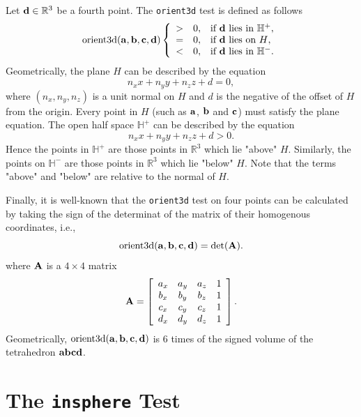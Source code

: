 Let ${\bf d} \in \mathbb{R}^3$ be a fourth point. The {\tt orient3d} test is defined as follows
\begin{equation}
  \textrm{orient3d}({\bf a}, {\bf b}, {\bf c}, {\bf d})
  \left\{
  \begin{array}{ccl}
  > & 0, & \textrm{if ${\bf d}$ lies in $\mathbb{H}^+$},\\
  = & 0, & \textrm{if ${\bf d}$ lies on $H$},\\
  < & 0, & \textrm{if ${\bf d}$ lies in $\mathbb{H}^-$}.  
  \end{array}
  \right.
\end{equation}
Geometrically, the plane $H$ can be described by the equation
\[
 n_x x + n_y y + n_z z + d = 0,
\]
where $(n_x, n_y, n_z)$ is a unit normal on $H$ and $d$ is the negative of the offset of $H$ from the origin. Every point in $H$ (such as ${\bf a}$, ${\bf b}$ and ${\bf c}$) must satisfy the plane equation. The open half space $\mathbb{H}^+$ can be described by the equation
\[
 n_x x + n_y y + n_z z + d > 0.
\]
Hence the points in $\mathbb{H}^+$ are those points in $\mathbb{R}^3$ which lie "above" $H$. Similarly, the points on $\mathbb{H}^-$ are those points  in $\mathbb{R}^3$ which lie "below" $H$. Note that the terms "above" and "below" are relative to the normal of $H$.

Finally, it is well-known that the {\tt orient3d} test on four points can be calculated by taking the sign of the determinat of the matrix of their homogenous coordinates, i.e.,
\begin{equation}
  \textrm{orient3d}({\bf a}, {\bf b}, {\bf c}, {\bf d}) = \textrm{det}({\bf A}).
\end{equation}
where ${\bf A}$ is a $4 \times 4$ matrix
\[
  {\bf A} = \left[\begin{array}{cccc}
      a_x & a_y & a_z & 1\\
      b_x & b_y & b_z  & 1\\
      c_x & c_y & c_z  & 1\\
      d_x & d_y & d_z  & 1
      \end{array}\right].
\]
Geometrically, $\textrm{orient3d}({\bf a}, {\bf b}, {\bf c}, {\bf d})$ is $6$ times of the signed volume of the tetrahedron ${\bf abcd}$.

\section{The {\tt insphere} Test}


